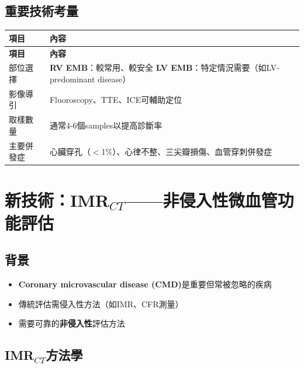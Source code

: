 \documentclass[12pt,a4paper]{article}
\begin{document}
\subsection{重要技術考量}

\begin{longtable}{p{4cm}p{10cm}}
\toprule
\textbf{項目} & \textbf{內容} \\
\midrule
\endfirsthead
\toprule
\textbf{項目} & \textbf{內容} \\
\midrule
\endhead
\bottomrule
\endfoot

部位選擇 & \textbf{RV EMB}：較常用、較安全\newline
\textbf{LV EMB}：特定情況需要（如LV-predominant disease） \\
\midrule
影像導引 & Fluoroscopy、TTE、ICE可輔助定位 \\
\midrule
取樣數量 & 通常4-6個samples以提高診斷率 \\
\midrule
主要併發症 & 心臟穿孔（$<$1\%）、心律不整、三尖瓣損傷、血管穿刺併發症 \\
\bottomrule
\end{longtable}


\section{新技術：IMR$_{CT}$——非侵入性微血管功能評估}

\subsection{背景}

\begin{itemize}
    \item \textbf{Coronary microvascular disease (CMD)}是重要但常被忽略的疾病
    \item 傳統評估需侵入性方法（如IMR、CFR測量）
    \item 需要可靠的\textbf{非侵入性}評估方法
\end{itemize}

\subsection{IMR$_{CT}$方法學}
\end{document}
